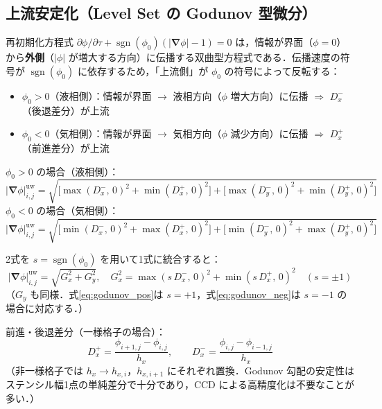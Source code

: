 \documentclass[12pt, a4paper, titlepage]{article}
\newcommand{\jp}[1]{{\normalfont\jpfont #1}}
\newcommand{\bnabla}{\bm{\nabla}}
\begin{document}
\subsection{\jp{上流安定化（Level Set の Godunov 型微分）}}
\label{sec:upstream}

\jp{再初期化方程式 $\partial\phi/\partial\tau + \operatorname{sgn}(\phi_0)(|\bnabla\phi|-1)=0$ は，情報が界面（$\phi=0$）から\textbf{外側}（$|\phi|$ が増大する方向）に伝播する双曲型方程式である．伝播速度の符号が $\operatorname{sgn}(\phi_0)$ に依存するため，「上流側」が $\phi_0$ の符号によって反転する：}
\begin{itemize}
  \item \jp{$\phi_0 > 0$（液相側）：情報が界面 $\to$ 液相方向（$\phi$ 増大方向）に伝播 $\Rightarrow$ $D^-_x$（後退差分）が上流}
  \item \jp{$\phi_0 < 0$（気相側）：情報が界面 $\to$ 気相方向（$\phi$ 減少方向）に伝播 $\Rightarrow$ $D^+_x$（前進差分）が上流}
\end{itemize}

\begin{tcolorbox}[mybox, title={Godunov \jp{型上流勾配（$\phi_0$ 符号依存，2次元）}}]
\jp{$\phi_0 > 0$ の場合（液相側）：}
\begin{equation}
  |\bnabla\phi|^{\mathrm{uw}}_{i,j} =
  \sqrt{
    \bigl[\max(D^-_x,\,0)^2 + \min(D^+_x,\,0)^2\bigr]
    +
    \bigl[\max(D^-_y,\,0)^2 + \min(D^+_y,\,0)^2\bigr]
  }
  \label{eq:godunov_pos}
\end{equation}
\jp{$\phi_0 < 0$ の場合（気相側）：}
\begin{equation}
  |\bnabla\phi|^{\mathrm{uw}}_{i,j} =
  \sqrt{
    \bigl[\min(D^-_x,\,0)^2 + \max(D^+_x,\,0)^2\bigr]
    +
    \bigl[\min(D^-_y,\,0)^2 + \max(D^+_y,\,0)^2\bigr]
  }
  \label{eq:godunov_neg}
\end{equation}
\end{tcolorbox}

\jp{2式を $s = \operatorname{sgn}(\phi_0)$ を用いて1式に統合すると：}
\begin{equation}
  |\bnabla\phi|^{\mathrm{uw}}_{i,j} =
  \sqrt{G_x^2 + G_y^2}, \quad
  G_x^2 = \max(s\,D^-_x,\,0)^2 + \min(s\,D^+_x,\,0)^2
  \quad (s=\pm1)
  \label{eq:godunov_unified}
\end{equation}
\jp{（$G_y$ も同様．式\eqref{eq:godunov_pos}は $s=+1$，式\eqref{eq:godunov_neg}は $s=-1$ の場合に対応する．）}

\jp{前進・後退差分（一様格子の場合）：}
\begin{equation}
  D^+_x = \frac{\phi_{i+1,j}-\phi_{i,j}}{h_x},\qquad
  D^-_x = \frac{\phi_{i,j}-\phi_{i-1,j}}{h_x}
\end{equation}
\jp{（非一様格子では $h_x \to h_{x,i}$，$h_{x,i+1}$ にそれぞれ置換．Godunov 勾配の安定性はステンシル幅1点の単純差分で十分であり，CCD による高精度化は不要なことが多い．）}
\end{document}
